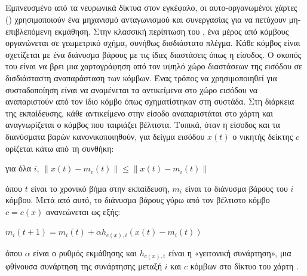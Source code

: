 \subsection{}
Εμπνευσμένο από τα νευρωνικά δίκτυα στον εγκέφαλο, οι αυτο-οργανωμένοι χάρτες () χρησιμοποιούν ένα μηχανισμό ανταγωνισμού και συνεργασίας για να πετύχουν μη-επιβλεπόμενη εκμάθηση.  Στην κλασσική περίπτωση του , ένα μέρος από κόμβους οργανώνεται σε γεωμετρικό σχήμα, συνήθως δισδιάστατο πλέγμα. Κάθε κόμβος είναι σχετίζεται με ένα διάνυσμα βάρους με τις ίδιες διαστάσεις όπως η είσοδος. Ο σκοπός του  είναι να βρει μια χαρτογράφηση από τον υψηλό χώρο διαστάσεων της εισόδου σε δισδιάσταστη αναπαράσταση των κόμβων. Ένας τρόπος να χρησιμοποιηθεί για συσταδοποίηση είναι να αναμένεται τα αντικείμενα στο χώρο εισόδου να αναπαριστούν από τον ίδιο κόμβο όπως σχηματίστηκαν στη συστάδα. Στη διάρκεια της εκπαίδευσης, κάθε αντικείμενο στην είσοδο αναπαριστάται στο χάρτη και αναγνωρίζεται ο κόμβος που ταιριάζει βέλτιστα. Τυπικά, όταν η είσοδος και τα διανύσματα βαρών κανονικοποιηθούν, για δείγμα εισόδου $x(t)$ ο νικητής δείκτης $c$ ορίζεται κάτω από τη συνθήκη:
\begin{center}
για όλα $i$, $\|x(t)-m_c(t)\| \leq \|x(t)-m_i(t)\|$
\end{center}
όπου $t$ είναι το χρονικό βήμα στην εκπαίδευση, $m_i$ είναι το διάνυσμα βάρους του $i$ κόμβου. Μετά από αυτό, το διάνυσμα βάρους γύρω από τον βέλτιστο κόμβο $c=c(x)$ ανανεώνεται ως εξής:
\begin{center}
 $m_i(t+1)=m_i(t)+\alpha h_{c(x),i}(x(t)-m_i(t))$
\end{center}
όπου $\alpha$ είναι ο ρυθμός εκμάθησης και $h_{c(x),i}$ είναι η «γειτονική συνάρτηση», μια φθίνουσα συνάρτηση της συνάρτησης μεταξή $i$ και $c$ κόμβων στο δίκτυο του χάρτη \cite{clustercomparison}.
